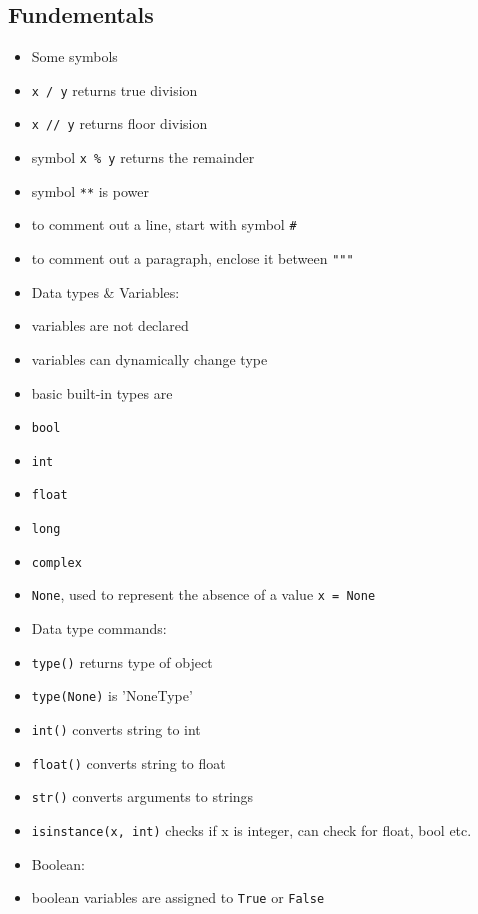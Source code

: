 \documentclass[onecolumn]{IEEEtran} %
\begin{document}
\subsection{Fundementals}
\begin{itemize}
    \item Some symbols
    \bi
        \item \verb|x / y| returns true division
        \item \verb|x // y| returns  floor division
        \item symbol \verb|x % y| returns the remainder
        \item symbol \verb|**| is power
        \item to comment out a line, start with symbol \verb|#|
        \item to comment out a paragraph, enclose it between \verb|"""|
    \ei
    \item Data types \& Variables:
    \bi
        \item variables are not declared
        \item variables can dynamically change type
        \item basic built-in types are
        \bi
            \item \verb|bool|
            \item \verb|int|
            \item \verb|float|
            \item \verb|long|
            \item \verb|complex|
            \item \verb|None|, used to represent the absence of a value
                \newline \verb|x = None|
        \ei
    \ei
    \item Data type commands:
    \bi
        \item \verb|type()| returns type of object
        \bi
            \item \verb|type(None)| is 'NoneType'
        \ei
        \item \verb|int()|  converts string to int
        \item \verb|float()| converts string to float
        \item \verb|str()| converts arguments to strings
        \item \verb|isinstance(x, int)| checks if x is integer, can check for float, bool etc.
    \ei
    \item Boolean:
    \bi
        \item boolean variables are assigned to \verb|True| or \verb|False|

\end{itemize}
\end{document}
